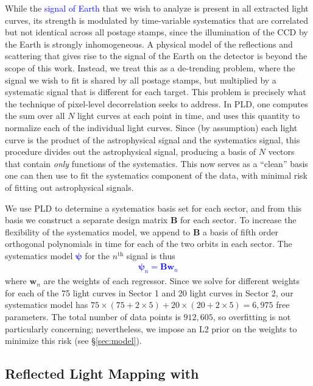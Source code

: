 \documentclass[modern]{aastex62}
\newcommand{\edited}[1]{\textcolor{blue}{#1}}
\begin{document}
While the \edited{signal of Earth} that we wish to analyze is present in all 
extracted light curves, its strength is modulated by time-variable systematics 
that are correlated but not identical across all postage stamps, since the
illumination of the CCD by the Earth is strongly inhomogeneous. A physical
model of the reflections and scattering that gives rise to the
signal of the Earth on the \TESS detector is beyond the scope of this work. Instead,
we treat this as a de-trending problem, where the signal we wish to fit is
shared by all postage stamps, but multiplied by a systematic signal that is
different for each target. This problem is precisely what the technique of
pixel-level decorrelation \citep[PLD;][]{Deming2015, Luger2016, Luger2018a}
seeks to address. In PLD, one computes the sum over all $N$ light curves at each
point in time, and uses this quantity to normalize each of the individual
light curves. Since (by assumption) each light curve is the product of the astrophysical
signal and the systematics signal, this procedure divides out the astrophysical
signal, producing a basis of $N$ vectors that contain \emph{only} functions of the
systematics. This now serves as a ``clean'' basis one can then use to fit the 
systematics component of the data, with minimal risk of fitting out astrophysical signals. 

We use PLD to determine a systematics basis set for each \TESS sector, and
from this basis we construct a separate design matrix $\mathbf{B}$ for each sector. To
increase the flexibility of the systematics model, we append to $\mathbf{B}$ a basis of
fifth order orthogonal polynomials in time for each of the two orbits in each sector.
The systematics model \edited{$\boldsymbol{\psi}$} for the $n^\mathrm{th}$ signal is thus
%
\edited{%
\begin{align}
\boldsymbol{\psi}_n = \mathbf{B} \mathbf{w}_n
\end{align}
}%
where $\mathbf{w}_n$ are the weights of each regressor.
Since we solve for different weights for each of the 75 light curves in Sector 1
and 20 light curves in Sector 2, our systematics model has
$75 \times (75 + 2 \times 5) + 20 \times (20 + 2 \times 5) = 6,975$ free parameters.
The total number of data points is $912,605$, so overfitting is not particularly
concerning; nevertheless, we impose an L2 prior on the weights to minimize this risk
(see \S\ref{sec:model}).

\subsection{Reflected Light Mapping with \starry}
\label{sec:starry}
\end{document}
